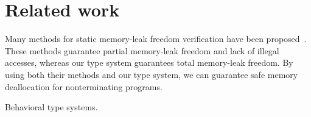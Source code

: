 
\section{Related work}\label{sec:relatedwork}
Many methods for static memory-leak freedom verification have been
proposed~\cite{DBLP:conf/aplas/SuenagaK09,DBLP:conf/pldi/HeineL03,DBLP:conf/sigsoft/XieA05,DBLP:journals/scp/SwamyHMGJ06,DBLP:conf/sas/OrlovichR06,DBLP:conf/issta/SuiYX12}. These
methods guarantee partial memory-leak freedom and lack of illegal
accesses, whereas our type system guarantees total memory-leak
freedom. By using both their methods and our type system, we can
guarantee safe memory deallocation for nonterminating programs.

Behavioral type systems.
